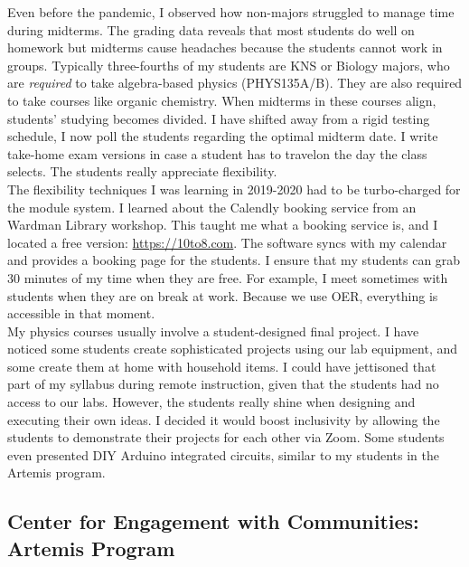 \documentclass[../../../main.tex]{subfiles}
\begin{document}
Even before the pandemic, I observed how non-majors struggled to manage time during midterms.  The grading data reveals that most students do well on homework but midterms cause headaches because the students cannot work in groups.  Typically three-fourths of my students are KNS or Biology majors, who are \textit{required} to take algebra-based physics (PHYS135A/B).  They are also required to take courses like organic chemistry.  When midterms in these courses align, students' studying becomes divided.  I have shifted away from a rigid testing schedule, I now poll the students regarding the optimal midterm date.  I write take-home exam versions in case a student has to travelon the day the class selects.  The students really appreciate flexibility.
\\
\vspace{0.15cm}
The flexibility techniques I was learning in 2019-2020 had to be turbo-charged for the module system.  I learned about the Calendly booking service from an Wardman Library workshop.  This taught me what a booking service is, and I located a free version: \url{https://10to8.com}.  The software syncs with my calendar and provides a booking page for the students.  I ensure that my students can grab 30 minutes of my time when they are free.  For example, I meet sometimes with students when they are on break at work.  Because we use OER, everything is accessible in that moment.
\\
\vspace{0.15cm}
My physics courses usually involve a student-designed final project.  I have noticed some students create sophisticated projects using our lab equipment, and some create them at home with household items.  I could have jettisoned that part of my syllabus during remote instruction, given that the students had no access to our labs.  However, the students really shine when designing and executing their own ideas.  I decided it would boost inclusivity by allowing the students to demonstrate their projects for each other via Zoom.  Some students even presented DIY Arduino integrated circuits, similar to my students in the Artemis program.

\subsection{Center for Engagement with Communities: Artemis Program}
\label{sec:cec}
\end{document}
